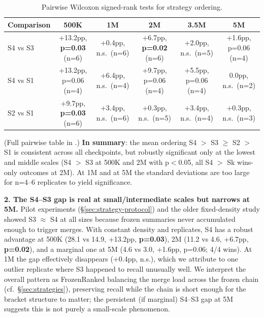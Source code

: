 \begin{table}[h]
\centering
\caption{Pairwise Wilcoxon signed-rank tests for strategy ordering.}
\label{tab:strategy-wilcoxon}
\small
\begin{tabular}{lccccc}
\toprule
Comparison & 500K & 1M & 2M & 3.5M & 5M \\
\midrule
S4 vs S3 & +13.2pp, \textbf{p=0.03} (n=6) & +0.4pp, n.s.\ (n=6) & +6.7pp, \textbf{p=0.02} (n=6) & +2.0pp, n.s.\ (n=5) & +1.6pp, p=0.06 (n=4) \\
S4 vs S1 & +13.2pp, p=0.06 (n=4) & +6.4pp, n.s.\ (n=4) & +9.7pp, p=0.06 (n=4) & +5.5pp, p=0.06 (n=4) & 0.0pp, n.s.\ (n=2) \\
S2 vs S1 & +9.7pp, \textbf{p=0.03} (n=6) & +3.4pp, n.s.\ (n=6) & +0.3pp, n.s.\ (n=5) & +3.4pp, n.s.\ (n=4) & +0.3pp, n.s.\ (n=3) \\
\bottomrule
\end{tabular}
\end{table}

(Full pairwise table in .) \textbf{In summary}: the mean
ordering S4 $>$ S3 $\geq$ S2 $>$ S1 is consistent across all checkpoints, but
robustly significant only at the lowest and middle scales (S4 $>$ S3 at 500K
and 2M with p$<$0.05, all S4 $>$ Sk wins-only outcomes at 2M). At 1M
and at 5M the standard deviations are too large for n=4--6 replicates to
yield significance.

\textbf{2. The S4--S3 gap is real at small/intermediate scales but narrows at 5M.}
Pilot experiments (\S\ref{sec:strategy-protocol}) and the older fixed-density study showed
S3 $\approx$ S4 at all sizes because frozen summaries never accumulated enough to
trigger merges. With constant density and replicates, S4 has a robust
advantage at 500K (28.1 vs 14.9, +13.2pp, \textbf{p=0.03}), 2M (11.2 vs 4.6,
+6.7pp, \textbf{p=0.02}), and a marginal one at 5M (4.6 vs 3.0, +1.6pp,
p=0.06; 4/4 wins). At 1M the gap effectively disappears (+0.4pp, n.s.),
which we attribute to one outlier replicate where S3 happened to recall
unusually well. We interpret the overall pattern as FrozenRanked balancing
the merge load across the frozen chain (cf.\ \S\ref{sec:strategies}), preserving recall
while the chain is short enough for the bracket structure to matter;
the persistent (if marginal) S4--S3 gap at 5M suggests this is not purely
a small-scale phenomenon.

